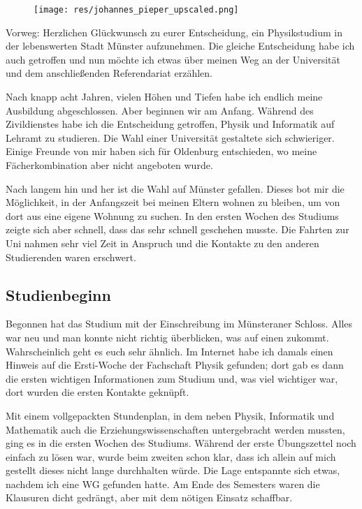 \begin{multicols*}{2}
\begin{wrapfigure}[8]{r}{0cm}
	\texttt{[image: res/johannes\_pieper\_upscaled.png]}
\end{wrapfigure}
Vorweg: Herzlichen Glückwunsch zu eurer Entscheidung, ein Physikstudium in der lebenswerten Stadt Münster aufzunehmen.
Die gleiche Entscheidung habe ich auch getroffen und nun möchte ich etwas über meinen Weg an der Universität und dem anschließenden Referendariat erzählen.

Nach knapp acht Jahren, vielen Höhen und Tiefen habe ich endlich meine Ausbildung abgeschlossen.
Aber beginnen wir am Anfang.
Während des Zivildienstes habe ich die Entscheidung getroffen, Physik und Informatik auf Lehramt zu studieren.
Die Wahl einer Universität gestaltete sich schwieriger.
Einige Freunde von mir haben sich für Oldenburg entschieden, wo meine Fächerkombination aber nicht angeboten wurde.

Nach langem hin und her ist die Wahl auf Münster gefallen.
Dieses bot mir die Möglichkeit, in der Anfangszeit bei meinen Eltern wohnen zu bleiben, um von dort aus eine eigene Wohnung zu suchen.
In den ersten Wochen des Studiums zeigte sich aber schnell, dass das sehr schnell geschehen musste.
Die Fahrten zur Uni nahmen sehr viel Zeit in Anspruch und die Kontakte zu den anderen Studierenden waren erschwert.

\subsection{Studienbeginn}
Begonnen hat das Studium mit der Einschreibung im Münsteraner Schloss.
Alles war neu und man konnte nicht richtig überblicken, was auf einen zukommt.
Wahrscheinlich geht es euch sehr ähnlich.
Im Internet habe ich damals einen Hinweis auf die Ersti-Woche der Fachschaft Physik gefunden; dort gab es dann die ersten wichtigen Informationen zum Studium und, was viel wichtiger war, dort wurden die ersten Kontakte geknüpft.

Mit einem vollgepackten Stundenplan, in dem neben Physik, Informatik und Mathematik auch die Erziehungswissenschaften untergebracht werden mussten, ging es in die ersten Wochen des Studiums.
Während der erste Übungszettel noch einfach zu lösen war, wurde beim zweiten schon klar, dass ich allein auf mich gestellt dieses nicht lange durchhalten würde.
Die Lage entspannte sich etwas, nachdem ich eine WG gefunden hatte.
Am Ende des Semesters waren die Klausuren dicht gedrängt, aber mit dem nötigen Einsatz schaffbar.


\end{multicols*}
